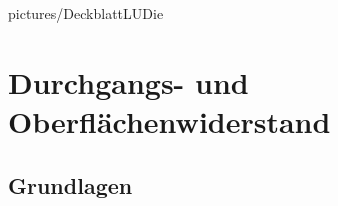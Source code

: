 \documentclass[a4paper,twoside,12pt,DIV=13,BCOR=5mm,numbers=noenddot,cleardoublepage=empty]{scrbook}
\begin{document}
    \renewcommand{\baselinestretch}{1.25}
    \newcommand{\StudentA}{Philipp Hanser}
    \newcommand{\MatrNrA}{11775264}
    \newcommand{\StudentB}{Florian Strebl}
    \newcommand{\MatrNrB}{11712190}
    \newcommand{\StudentC}{Alexander Seiler}
    \newcommand{\MatrNrC}{11771276}

    \newcommand{\LUDatum}{06.06.2019}
    \newcommand{\LUGruppe}{Gr. 15}
    \newcommand{\LUBetreuer}{Geiginger, Lisa-Marie}  

    \large
    
    {pictures/DeckblattLUDie}


    \setcounter{tocdepth}{3}

    \setcounter{page}{0}
    \renewcommand{\thepage}{\roman{page}}
    \tableofcontents \cleardoublepage

    \setcounter{page}{1}
    \renewcommand{\thepage}{\arabic{page}}
    \setcounter{chapter}{0}

    \chapter{Durchgangs- und Oberfl\"achenwiderstand}
        \section{Grundlagen}
\end{document}
